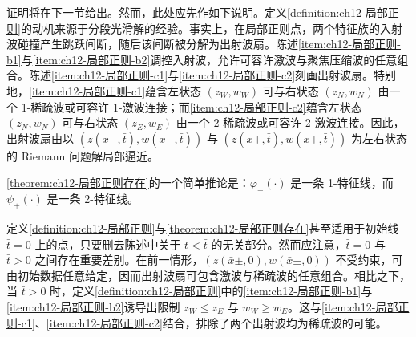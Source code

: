 \documentclass[../../main.tex]{subfiles}
\begin{document}
证明将在下一节给出。然而，此处应先作如下说明。定义\cref{definition:ch12-局部正则}的动机来源于分段光滑解的经验。事实上，在局部正则点，两个特征族的入射波碰撞产生跳跃间断，随后该间断被分解为出射波扇。陈述\ref{item:ch12-局部正则-b1}与\ref{item:ch12-局部正则-b2}调控入射波，允许可容许激波与聚焦压缩波的任意组合。陈述\ref{item:ch12-局部正则-c1}与\ref{item:ch12-局部正则-c2}刻画出射波扇。特别地，\ref{item:ch12-局部正则-c1}蕴含左状态 $(z_W,w_W)$ 可与右状态 $(z_N,w_N)$ 由一个 1-稀疏波或可容许 1-激波连接；而\ref{item:ch12-局部正则-c2}蕴含左状态 $(z_N,w_N)$ 可与右状态 $(z_E,w_E)$ 由一个 2-稀疏波或可容许 2-激波连接。因此，出射波扇由以 $(z(\bar x-,\bar t),w(\bar x-,\bar t))$ 与 $(z(\bar x+,\bar t),w(\bar x+,\bar t))$ 为左右状态的 Riemann 问题解局部逼近。

\cref{theorem:ch12-局部正则存在}的一个简单推论是：$\varphi_-(\cdot)$ 是一条 1-特征线，而 $\psi_+(\cdot)$ 是一条 2-特征线。

定义\cref{definition:ch12-局部正则}与\cref{theorem:ch12-局部正则存在}甚至适用于初始线 $\bar t=0$ 上的点，只要删去陈述中关于 $t<\bar t$ 的无关部分。然而应注意，$\bar t=0$ 与 $\bar t>0$ 之间存在重要差别。在前一情形，$(z(\bar x\pm,0),w(\bar x\pm,0))$ 不受约束，可由初始数据任意给定，因而出射波扇可包含激波与稀疏波的任意组合。相比之下，当 $\bar t>0$ 时，定义\cref{definition:ch12-局部正则}中的\ref{item:ch12-局部正则-b1}与\ref{item:ch12-局部正则-b2}诱导出限制 $z_W\leqslant z_E$ 与 $w_W\geqslant w_E$。这与\ref{item:ch12-局部正则-c1}、\ref{item:ch12-局部正则-c2}结合，排除了两个出射波均为稀疏波的可能。
\end{document}
